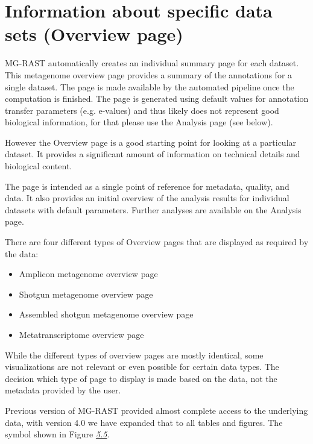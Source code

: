 \documentclass[letterpaper,10pt,english]{sphinxmanual}
\begin{document}
\section{Information about specific data sets (Overview page)}
\label{\detokenize{user_manual:information-about-specific-data-sets-overview-page}}
MG-RAST automatically creates an individual summary page for each
dataset. This metagenome overview page provides a summary of the
annotations for a single dataset. The page is made available by the
automated pipeline once the computation is finished. The page is
generated using default values for annotation transfer parameters (e.g.
e-values) and thus likely does not represent good biological
information, for that please use the Analysis page (see below).

However the Overview page is a good starting point for looking at a
particular dataset. It provides a significant amount of information on
technical details and biological content.

\begin{DUlineblock}{0em}
\item[] The page is intended as a single point of reference for metadata,
quality, and data. It also provides an initial overview of the
analysis results for individual datasets with default parameters.
Further analyses are available on the Analysis page.
\item[] There are four different types of Overview pages that are displayed as
required by the data:
\end{DUlineblock}
\begin{itemize}
\item {} 
Amplicon metagenome overview page

\item {} 
Shotgun metagenome overview page

\item {} 
Assembled shotgun metagenome overview page

\item {} 
Metatranscriptome overview page

\end{itemize}

While the different types of overview pages are mostly identical, some
visualizations are not relevant or even possible for certain data types.
The decision which type of page to display is made based on the data,
not the metadata provided by the user.

Previous version of MG-RAST provided almost complete  access
to the underlying data, with version 4.0 we have expanded that to all
tables and figures. The symbol shown in Figure
{\hyperref[\detokenize{user_manual:fig:download-symbol}]{\emph{5.5}}}.
\end{document}
